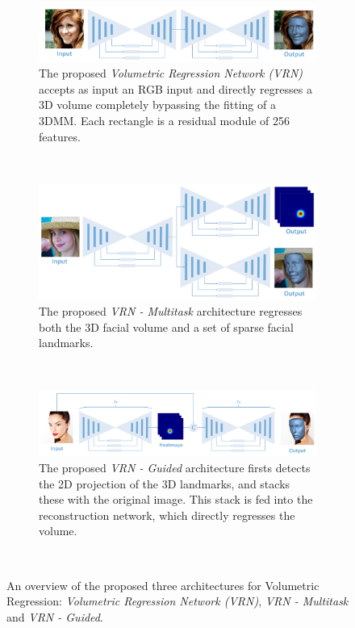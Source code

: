 \begin{figure}
  \centering
  \begin{subfigure}[t]{1\textwidth}
    \centering
    \includegraphics[width=0.81\linewidth]{img/baseline.pdf}
    \caption[Baseline reconstruction architecture]{The proposed
      \textit{Volumetric Regression Network (VRN)} accepts as input an
      RGB input and directly regresses a 3D volume completely bypassing
      the fitting of a 3DMM. Each rectangle is a residual module of 256
      features.}

    \label{fig:cnnbaseline}
  \end{subfigure}
  ~
  \begin{subfigure}[t]{1\textwidth}
    \centering
    \includegraphics[width=0.6\linewidth]{img/multitask.pdf}
    \caption[Multitask reconstruction architecture]{The proposed
      \textit{VRN - Multitask} architecture regresses both the 3D facial
      volume and a set of sparse facial landmarks.}
    \label{fig:cnnmultitask}
    \vspace{-2mm}
  \end{subfigure}
  ~
  \begin{subfigure}[t]{0.98\textwidth}
    \centering
    \includegraphics[width=\linewidth]{img/guided.pdf}
    \caption[Guided reconstruction architecture]{The proposed
      \textit{VRN - Guided} architecture firsts detects the 2D
      projection of the 3D landmarks, and stacks these with the original
      image. This stack is fed into the reconstruction network, which
      directly regresses the volume.}
    \label{fig:guidednet}
  \end{subfigure}
  ~
  \caption[Overview of proposed architectures]{An overview of the
    proposed three architectures for Volumetric Regression:
    \textit{Volumetric Regression Network (VRN)}, \textit{VRN -
      Multitask} and \textit{VRN - Guided}.}
  \label{fig:cnnall}
  \vspace{-5mm}
\end{figure}

